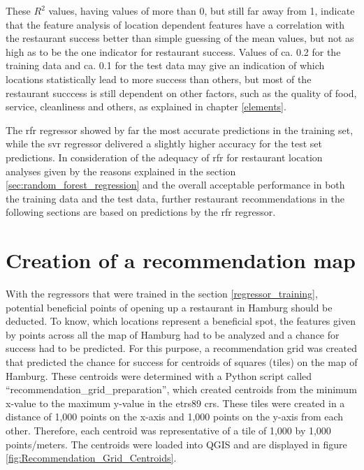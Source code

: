 \documentclass[a4paper, 11pt, oneside]{Thesis}  %
\begin{document}
These $R^2$ values, having values of more than 0, but still far away from 1, indicate that the feature analysis of location dependent features have a correlation with the restaurant success better than simple guessing of the mean values, but not as high as to be the one indicator for restaurant success. Values of ca. 0.2 for the training data and ca. 0.1 for the test data may give an indication of which locations statistically lead to more success than others, but most of the restaurant succcess is still dependent on other factors, such as the quality of food, service, cleanliness and others, as explained in chapter \ref{elements}.

The \ac{rfr} regressor showed by far the most accurate predictions in the training set, while the \ac{svr} regressor delivered a slightly higher accuracy for the test set predictions. In consideration of the adequacy of \ac{rfr} for restaurant location analyses given by the reasons explained in the section \ref{sec:random_forest_regression} and the overall acceptable performance in both the training data and the test data, further restaurant recommendations in the following sections are based on predictions by the \ac{rfr} regressor.


\section{Creation of a recommendation map}
\label{creation_of_recommendation_map}

With the regressors that were trained in the section \ref{regressor_training}, potential beneficial points of opening up a restaurant in Hamburg should be deducted. To know, which locations represent a beneficial spot, the features given by points across all the map of Hamburg had to be analyzed and a chance for success had to be predicted. For this purpose, a recommendation grid was created that predicted the chance for success for centroids of squares (tiles) on the map of Hamburg. These centroids were determined with a Python script called ``recommendation\_grid\_preparation'', which created centroids from the minimum x-value to the maximum y-value in the \ac{etrs89} \ac{crs}. These tiles were created in a distance of 1,000 points on the x-axis and 1,000 points on the y-axis from each other. Therefore, each centroid was representative of a tile of 1,000 by 1,000 points/meters. The centroids were loaded into QGIS and are displayed in figure \ref{fig:Recommendation_Grid_Centroids}.
\end{document}
